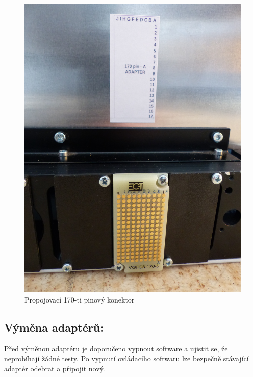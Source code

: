 \begin{figure}[ht!]
\begin{minipage}{0.49\textwidth}
		\end{minipage}
		\begin{minipage}{0.49\textwidth}
			\includegraphics[width = \textwidth, angle = -90]{obrazky/170pin.JPG}
			\caption{Propojovací 170-ti pinový konektor}
		\end{minipage}
	\end{figure}


    \subsection{Výměna adaptérů:}
	Před výměnou adaptéru je doporučeno vypnout software a ujistit se, že neprobíhají žádné testy. Po vypnutí ovládacího 
	softwaru lze bezpečně stávající adaptér odebrat a připojit nový.\\


